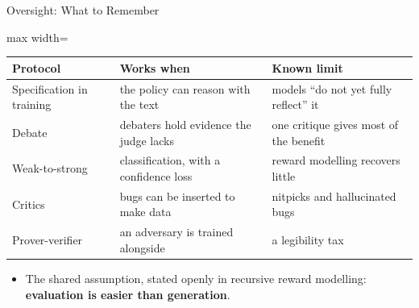 \begin{frame}{Oversight: What to Remember}
    \begin{center}
    \small
    \begin{adjustbox}{max width=\linewidth}\begin{tabular}{lll}
        \toprule
        \textbf{Protocol} & \textbf{Works when} & \textbf{Known limit} \\
        \midrule
        Specification in training & the policy can reason with the text & models ``do not yet fully reflect'' it \\
        Debate & debaters hold evidence the judge lacks & one critique gives most of the benefit \\
        Weak-to-strong & classification, with a confidence loss & reward modelling recovers little \\
        Critics & bugs can be inserted to make data & nitpicks and hallucinated bugs \\
        Prover-verifier & an adversary is trained alongside & a legibility tax \\
        \bottomrule
    \end{tabular}\end{adjustbox}
    \end{center}
    \begin{itemize}\itemsep0.4em
        \item The shared assumption, stated openly in recursive reward modelling: \textbf{evaluation is easier than generation}.
    \end{itemize}
\end{frame}
